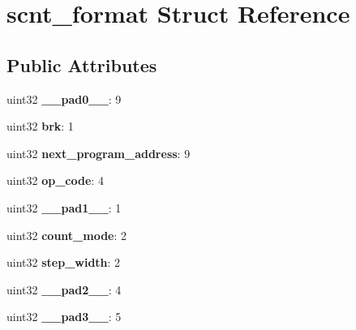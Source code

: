 \hypertarget{structscnt__format}{}\section{scnt\+\_\+format Struct Reference}
\label{structscnt__format}
\subsection*{Public Attributes}
\begin{DoxyCompactItemize}
\item 
\mbox{\label{structscnt__format_a502416e512e01ff8db1cfbf5ac1c042f}} 
uint32 {\bfseries \+\_\+\+\_\+pad0\+\_\+\+\_\+}\+: 9
\item 
\mbox{\label{structscnt__format_a35f32b2ab36e6275c4977922749fac33}} 
uint32 {\bfseries brk}\+: 1
\item 
\mbox{\label{structscnt__format_a167cda55c132f140643b014afb0ba78d}} 
uint32 {\bfseries next\+\_\+program\+\_\+address}\+: 9
\item 
\mbox{\label{structscnt__format_af42caf74fdbbb78f11ab1f8ed4bdf811}} 
uint32 {\bfseries op\+\_\+code}\+: 4
\item 
\mbox{\label{structscnt__format_aad72de6440581dae87fa852f1f5903ce}} 
uint32 {\bfseries \+\_\+\+\_\+pad1\+\_\+\+\_\+}\+: 1
\item 
\mbox{\label{structscnt__format_aa803c03123f2a92789d939a8c9792e4e}} 
uint32 {\bfseries count\+\_\+mode}\+: 2
\item 
\mbox{\label{structscnt__format_ac9ab628b207a69045387b9ce5c46afcf}} 
uint32 {\bfseries step\+\_\+width}\+: 2
\item 
\mbox{\label{structscnt__format_a7faad8d6fd94767da7167b560bcf7a8a}} 
uint32 {\bfseries \+\_\+\+\_\+pad2\+\_\+\+\_\+}\+: 4
\item 
\mbox{\label{structscnt__format_a60398970ea6cd34d275e7c072bd024d1}} 
uint32 {\bfseries \+\_\+\+\_\+pad3\+\_\+\+\_\+}\+: 5

\end{DoxyCompactItemize}
